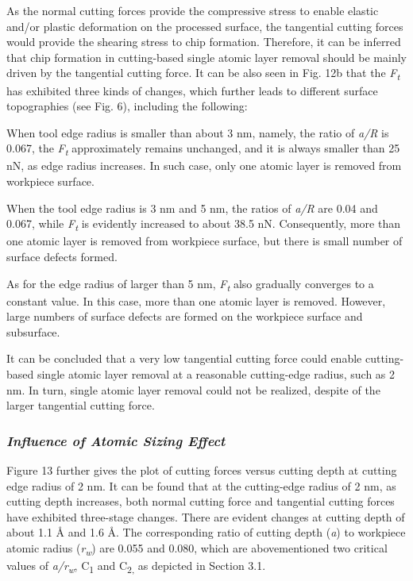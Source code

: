 \documentclass{article}
\begin{document}
As the normal cutting forces provide the compressive stress to enable elastic and/or plastic deformation on the processed surface, the tangential cutting forces would provide the shearing stress to chip formation. Therefore, it can be inferred that chip formation in cutting-based single atomic layer removal should be mainly driven by the tangential cutting force. It can be also seen in Fig. 12b that the \emph{F}\textsubscript{\emph{t}} has exhibited three kinds of changes, which further leads to different surface topographies (see Fig. 6), including the following:

When tool edge radius is smaller than about 3 nm, namely, the ratio of \emph{a/R} is 0.067, the \emph{F}\textsubscript{\emph{t}} approximately remains unchanged, and it is always smaller than 25 nN, as edge radius increases. In such case, only one atomic layer is removed from workpiece surface.

When the tool edge radius is 3 nm and 5 nm, the ratios of \emph{a/R} are 0.04 and 0.067, while \emph{F}\textsubscript{\emph{t}} is evidently increased to about 38.5 nN. Consequently, more than one atomic layer is removed from workpiece surface, but there is small number of surface defects formed.

As for the edge radius of larger than 5 nm, \emph{F}\textsubscript{\emph{t}} also gradually converges to a constant value. In this case, more than one atomic layer is removed. However, large numbers of surface defects are formed on the workpiece surface and subsurface.

It can be concluded that a very low tangential cutting force could enable cutting-based single atomic layer removal at a reasonable cutting-edge radius, such as 2 nm. In turn, single atomic layer removal could not be realized, despite of the larger tangential cutting force.

\subsubsection*{\emph{Influence of Atomic Sizing Effect}}

Figure 13 further gives the plot of cutting forces versus cutting depth at cutting edge radius of 2 nm. It can be found that at the cutting-edge radius of 2 nm, as cutting depth increases, both normal cutting force and tangential cutting forces have exhibited three-stage changes. There are evident changes at cutting depth of about 1.1 Å and 1.6 Å. The corresponding ratio of cutting depth (\emph{a}) to workpiece atomic radius (\emph{r}\textsubscript{\emph{w}}) are 0.055 and 0.080, which are abovementioned two critical values of \emph{a/r}\textsubscript{\emph{w}}, C\textsubscript{1} and C\textsubscript{2,} as depicted in Section 3.1.
\end{document}
